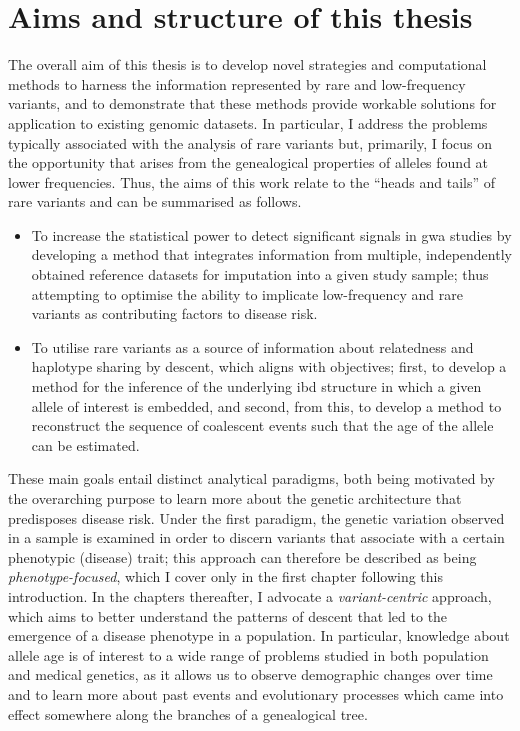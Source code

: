 %
\section{Aims and structure of this thesis}
%

The overall aim of this thesis is to develop novel strategies and computational methods to harness the information represented by rare and low-frequency variants, and to demonstrate that these methods provide workable solutions for application to existing genomic datasets.
In particular, I address the problems typically associated with the analysis of rare variants but, primarily, I focus on the opportunity that arises from the genealogical properties of alleles found at lower frequencies.
Thus, the aims of this work relate to the ``heads and tails'' of rare variants and can be summarised as follows.

\begin{itemize}
  \item To increase the statistical power to detect significant signals in \gls{gwa} studies by developing a method that integrates information from multiple, independently obtained reference datasets for imputation into a given study sample; thus attempting to optimise the ability to implicate low-frequency and rare variants as contributing factors to disease risk.
  \item To utilise rare variants as a source of information about relatedness and haplotype sharing by descent, which aligns with  objectives; first, to develop a method for the inference of the underlying \gls{ibd} structure in which a given allele of interest is embedded, and second, from this, to develop a method to reconstruct the sequence of coalescent events such that the age of the allele can be estimated.
\end{itemize}

These  main goals entail distinct analytical paradigms, both being motivated by the overarching purpose to learn more about the genetic architecture that predisposes disease risk.
Under the first paradigm, the genetic variation observed in a sample is examined in order to discern variants that associate with a certain phenotypic (disease) trait; this approach can therefore be described as being \emph{phenotype-focused}, which I cover only in the first chapter following this introduction.
In the chapters thereafter, I advocate a \emph{variant-centric} approach, which aims to better understand the patterns of descent that led to the emergence of a disease phenotype in a population.
In particular, knowledge about allele age is of interest to a wide range of problems studied in both population and medical genetics, as it allows us to observe demographic changes over time and to learn more about past events and evolutionary processes which came into effect somewhere along the branches of a genealogical tree.

